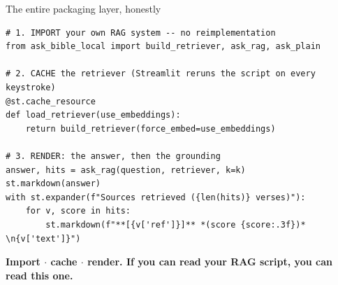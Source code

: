 \begin{frame}[fragile]{The entire packaging layer, honestly}
  \begin{lstlisting}[style=shell]
# 1. IMPORT your own RAG system -- no reimplementation
from ask_bible_local import build_retriever, ask_rag, ask_plain

# 2. CACHE the retriever (Streamlit reruns the script on every keystroke)
@st.cache_resource
def load_retriever(use_embeddings):
    return build_retriever(force_embed=use_embeddings)

# 3. RENDER: the answer, then the grounding
answer, hits = ask_rag(question, retriever, k=k)
st.markdown(answer)
with st.expander(f"Sources retrieved ({len(hits)} verses)"):
    for v, score in hits:
        st.markdown(f"**[{v['ref']}]** *(score {score:.3f})*  \n{v['text']}")
  \end{lstlisting}
  \vspace{2pt}
  \begin{center}\small\color{labnavy}\bfseries
    Import $\cdot$ cache $\cdot$ render. If you can read your RAG script, you can read this one.\end{center}
\end{frame}

